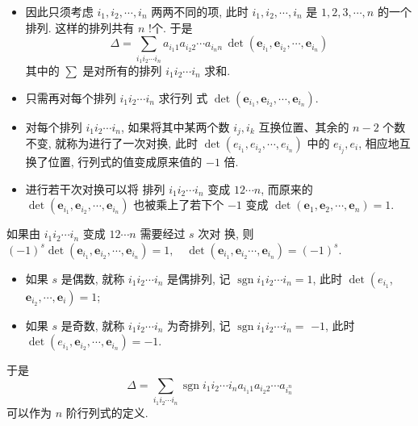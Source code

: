 \documentclass[10pt,punct]{ctexbeamer}
\begin{document}
\begin{frame}
    \begin{itemize}
        \item   因此只须考虑 $i_1, i_2, \cdots, i_n$ 两两不同的项, 此时 $i_1, i_2, \cdots, i_n$ 是 $1,2,3, \cdots, n$ 的一个排列. 这样的排列共有 $n$ !个. 于是
        $$
        \Delta=\sum_{i_1 i_2 \cdots i_n} a_{i_1 1} a_{i_2  2} \cdots a_{i_n n} \, \operatorname{det}\left(\boldsymbol{e}_{i_1}, \boldsymbol{e}_{i_2}, \cdots, \boldsymbol{e}_{i_n}\right)
        $$
        其中的 $\sum$ 是对所有的排列 $i_1 i_2 \cdots i_n$ 求和.
        \item   只需再对每个排列 $i_1 i_2 \cdots i_n$ 求行列 式 $\operatorname{det}\left(\boldsymbol{e}_{i_1}, \boldsymbol{e}_{i_2}, \cdots, \boldsymbol{e}_{i_n}\right)$.

        \pause
        \item
        对每个排列 $i_1 i_2 \cdots i_n$, 如果将其中某两个数 $i_j, i_k$ 互换位置、其余的 $n-2$ 个数不变, 就称为进行了一次\alert{对换}, 此时 $\operatorname{det}\left(e_{i_1}, e_{i_2}, \cdots, e_{i_n}\right)$ 中的 $e_{i_j}, e_i$, 相应地互换了位置, 行列式的值变成原来值的 $-1$ 倍.

        \item
        进行若干次对换可以将
        排列 $i_1 i_2 \cdots i_n$ 变成 $12 \cdots n$, 而原来的 $\operatorname{det}\left(\boldsymbol{e}_{i_1}, \boldsymbol{e}_{i_2}, \cdots, \boldsymbol{e}_{i_n}\right)$ 也被乘上了若下个 $-1$ 变成 $\operatorname{det}\left(\boldsymbol{e}_1, \boldsymbol{e}_2, \cdots, \boldsymbol{e}_n\right)=1$.

    \end{itemize}
\end{frame}

\begin{frame}


    如果由 $i_1 i_2 \cdots i_n$ 变成 $12 \cdots n$ 需要经过 $s$ 次{对 换}, 则
    $
    (-1)^s \operatorname{det}\left(\boldsymbol{e}_{i_1}, \boldsymbol{e}_{i_2}, \cdots, \boldsymbol{e}_{i_n}\right)=1, \quad \operatorname{det}\left(\boldsymbol{e}_{i_1}, \boldsymbol{e}_{i_2} \cdots, \boldsymbol{e}_{i_n}\right)=(-1)^s.
    $
    \begin{itemize}
        \item 如果 $s$ 是偶数, 就称 $i_1 i_2 \cdots i_n$ 是偶排列, 记 $\operatorname{sgn} i_1 i_2 \cdots i_n=1$, 此时 $\operatorname{det}\left(e_{i_1}\right.$, $\left.\boldsymbol{e}_{i_2}, \cdots, \boldsymbol{e}_i\right)=1$;
        \item 如果 $s$ 是奇数, 就称 $i_1 i_2 \cdots i_n$ 为奇排列, 记 $\operatorname{sgn}i_1 i_2 \cdots i_n=$ $-1$, 此时 $\operatorname{det}\left(e_{i_1}, \boldsymbol{e}_{i_2}, \cdots, \boldsymbol{e}_{i_n}\right)=-1$.
    \end{itemize}

    于是 $$\Delta=\sum_{ i_1 i_2 \cdots i_n}  \operatorname{sgn}  i_1 i_2 \cdots i_n a_{i_1 1} a_{i_2 2} \cdots a_{i_n^n}$$ 可以作为 $n$ 阶行列式的定义.
\end{frame}
\end{document}
